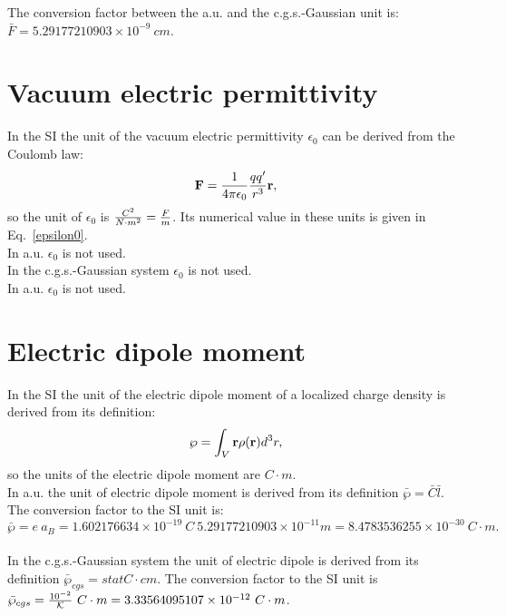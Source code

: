 \documentclass[12pt,a4paper]{article}
\def\e{1.602176634\times 10^{-19}}
\def\abohr{5.29177210903\times 10^{-11}}
\def\bardip{8.4783536255\times 10^{-30}}
\def\diptodip{3.33564095107\times 10^{-12}}
\def\barcapcgs{5.29177210903\times 10^{-9}}
\begin{document}
{\color{green} 
The conversion factor between the a.u. and the c.g.s.-Gaussian unit is: 
$\bar F = \barcapcgs \ cm$.
}


\newpage
\section{\color{coral}Vacuum electric permittivity}
In the SI the unit of the vacuum electric permittivity $\epsilon_0$
can be derived from the Coulomb law:
\begin{equation}
{\bf F} = {1\over 4 \pi \epsilon_0} {qq'\over r^3} {\bf r},
\end{equation}
so the unit of $\epsilon_0$ is ${C^2 \over N\cdot m^2}={F\over m}$. 
Its numerical
value in these units is given in Eq.~\ref{epsilon0}.
\\

{\color{web-blue} In a.u. $\epsilon_0$ is not used.} 
\\

{\color{orange} In the c.g.s.-Gaussian system $\epsilon_0$ is not used.
}
\\

{\color{green} In a.u. $\epsilon_0$ is not used. 
\\
}

\newpage
\section{\color{coral}Electric dipole moment}
In the SI the unit of the electric dipole moment of a localized
charge density is derived from its definition:
\begin{equation}
{\bf \wp}=\int_V {\bf r} \rho({\bf r}) d^3r,
\end{equation}
so the units of the electric dipole moment are $C\cdot m$.
\\

{\color{web-blue} In a.u. the unit of electric dipole moment is derived
from its definition $\bar \wp=\bar C \bar l$. The conversion factor to the
SI unit is:
\begin{equation}
\bar \wp = e\ a_B = \e\ C\ \abohr m = \bardip\ C\cdot m.
\end{equation}
} 
\\

{\color{orange} In the c.g.s.-Gaussian system the unit of electric 
dipole is derived from its definition $\bar \wp_{cgs}=statC\cdot cm$.
The conversion factor to the SI unit is $\bar \wp_{cgs}={10^{-2} \over 
\mathcal{K}}
\ C\cdot m=\diptodip\ C\cdot m$.
}
\\
\end{document}
